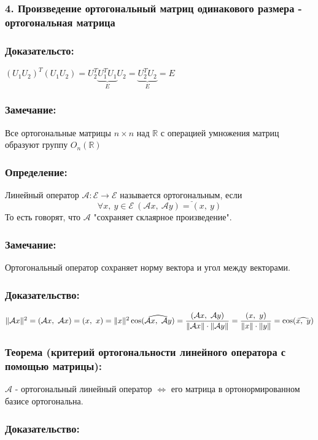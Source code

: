 \documentclass[12pt, letterpaper, twoside]{article}
\newcommand{\Underl}[1]{$\underline{\text{#1}}$}
\newcommand{\mb}[1]{\mathbb{#1}}
\begin{document}
    \subsubsection*{4. Произведение ортогональный матриц одинакового размера - ортогональная матрица}
    \subsubsection*{Доказательсто:}
    $(U_1 U_2)^T (U_1 U_2) = U_2^T \underset{E}{\underbrace{U_1^T U_1}} U_2 = \underset{E}{\underbrace{U_2^T U_2}} = E$
    \subsubsection*{Замечание:}
    Все ортогональные матрицы $n\times n$ над $\mb{R}$ с операцией умножения матриц образуют группу $O_n(\mb{R})$
    \subsubsection*{Определение:}
    Линейный оператор $\mathcal{A}: \mathcal{E} \longrightarrow \mathcal{E}$ называется \Underl{ортогональным}, если
    \[\forall x,\ y\in \mathcal{E}\ (\mathcal{A} x,\ \mathcal{A} y) = (x,\ y)\]
    То есть говорят, что $\mathcal{A}$ "сохраняет склаярное произведение".
    \subsubsection*{Замечание:}
    Ортогональный оператор сохраняет норму вектора и угол между векторами.
    \subsubsection*{Доказательство:}
    $\Vert \mathcal{A} x\Vert^2 = (\mathcal{A} x,\ \mathcal{A} x) = (x,\ x) = \Vert x \Vert ^2\\
    \cos (\widehat{\mathcal{A} x,\ \mathcal{A} y}) = \dfrac{(\mathcal{A} x,\ \mathcal{A} y)}{\Vert \mathcal{A} x\Vert \cdot \Vert \mathcal{A} y \Vert} = \dfrac{(x,\ y)}{\Vert x\Vert\cdot \Vert y \Vert} = \cos (\widehat{x,\ y})$
    \subsubsection*{Теорема (критерий ортогональности линейного оператора с помощью матрицы):}
    $\mathcal{A}$ - ортогональный линейный оператор $\Leftrightarrow$ его матрица в ортонормированном базисе ортогональна.
    \subsubsection*{Доказательство:}
\end{document}
